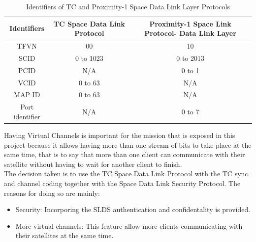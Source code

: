 \documentclass[12pt,a4paper]{report}
\begin{document}
\begin{table}[H]
\begin{center}
\begin{tabular}{|c|c|c|}
\hline
Identifiers&TC Space Data Link Protocol&Proximity-1 Space Link Protocol- Data Link Layer\\
\hline
TFVN&00&10\\
\hline
SCID&0 to 1023&0 to 2013\\
\hline
PCID&N/A&0 to 1\\
\hline
VCID&0 to 63&N/A\\
\hline
MAP ID&0 to 63&N/A\\
\hline
Port identifier&N/A&0 to 7\\
\hline
\end{tabular}
\caption{Identifiers of TC and Proximity-1 Space Data Link Layer Protocols}
\end{center}
\end{table} 
Having Virtual Channels is important for the mission that is exposed in this project because it allows having more than one stream of bits to take place at the same time, that is to say that more than one client can communicate with their satellite without having to wait for another client to finish.\\
The decision taken is to use the TC Space Data Link Protocol with the TC sync. and channel coding together with the Space Data Link Security Protocol. The reasons for doing so are mainly:
\begin{itemize}
\item Security: Incorporing the SLDS authentication and confidentality is provided.
\item More virtual channels: This feature allow more clients communicating with their satellites at the same time.
\end{itemize}
\end{document}
